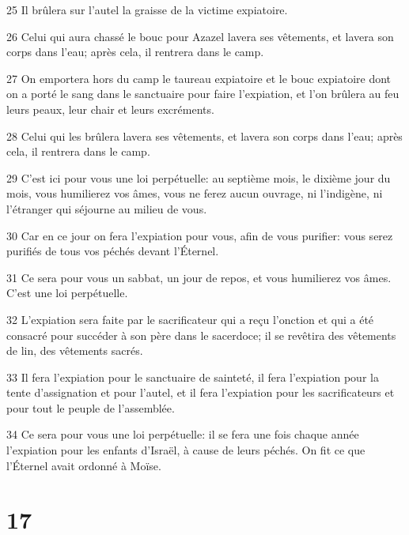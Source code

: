 \par 25 Il brûlera sur l'autel la graisse de la victime expiatoire.
\par 26 Celui qui aura chassé le bouc pour Azazel lavera ses vêtements, et lavera son corps dans l'eau; après cela, il rentrera dans le camp.
\par 27 On emportera hors du camp le taureau expiatoire et le bouc expiatoire dont on a porté le sang dans le sanctuaire pour faire l'expiation, et l'on brûlera au feu leurs peaux, leur chair et leurs excréments.
\par 28 Celui qui les brûlera lavera ses vêtements, et lavera son corps dans l'eau; après cela, il rentrera dans le camp.
\par 29 C'est ici pour vous une loi perpétuelle: au septième mois, le dixième jour du mois, vous humilierez vos âmes, vous ne ferez aucun ouvrage, ni l'indigène, ni l'étranger qui séjourne au milieu de vous.
\par 30 Car en ce jour on fera l'expiation pour vous, afin de vous purifier: vous serez purifiés de tous vos péchés devant l'Éternel.
\par 31 Ce sera pour vous un sabbat, un jour de repos, et vous humilierez vos âmes. C'est une loi perpétuelle.
\par 32 L'expiation sera faite par le sacrificateur qui a reçu l'onction et qui a été consacré pour succéder à son père dans le sacerdoce; il se revêtira des vêtements de lin, des vêtements sacrés.
\par 33 Il fera l'expiation pour le sanctuaire de sainteté, il fera l'expiation pour la tente d'assignation et pour l'autel, et il fera l'expiation pour les sacrificateurs et pour tout le peuple de l'assemblée.
\par 34 Ce sera pour vous une loi perpétuelle: il se fera une fois chaque année l'expiation pour les enfants d'Israël, à cause de leurs péchés. On fit ce que l'Éternel avait ordonné à Moïse.

\chapter{17}

